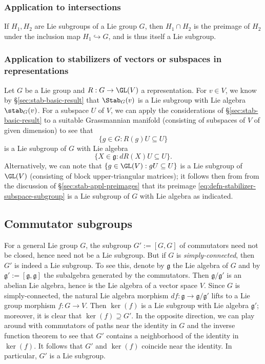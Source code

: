 \documentclass[reqno]{amsart} 
\begin{document}
\subsubsection{Application to intersections}
\label{sec:org60c2f88}
If $H_1, H_2$ are Lie subgroups of a Lie group $G$, then $H_1 \cap H_2$ is the preimage of $H_2$ under the inclusion map $H_1 \hookrightarrow G$, and is thus itself a Lie subgroup.

\subsubsection{Application to stabilizers of vectors or subspaces in representations}
\label{sec:orgc9b1def}
Let $G$ be a Lie group and $R : G \rightarrow \GL(V)$ a representation.  For $v \in V$, we know by \S\ref{sec:stab-basic-result} that $\Stab_G(v)$ is a Lie subgroup with Lie algebra $\stab_G(v)$.  For a subspace $U$ of $V$, we can apply the considerations of \S\ref{sec:stab-basic-result} to a suitable Grassmannian manifold (consisting of subspaces of $V$ of given dimension) to see that
\begin{equation}\label{eq:defn-stabilizer-subspace-subgroup}
  \{g \in G : R(g) U \subseteq U\}
\end{equation}
is a Lie subgroup of $G$ with Lie algebra
\begin{equation*}
  \{X \in \mathfrak{g} : d R(X) U \subseteq U \}.
\end{equation*}
Alternatively, we can note that $\{g \in \GL(V) : g U \subseteq U\}$ is a Lie subgroup of $\GL(V)$ (consisting of block upper-triangular matrices); it follows then from from the discussion of \S\ref{sec:stab-appl-preimages} that its preimage \eqref{eq:defn-stabilizer-subspace-subgroup} is a Lie subgroup of $G$ with Lie algebra as indicated.

\subsection{Commutator subgroups}
\label{sec:orge98ecbb}
For a general Lie group $G$, the subgroup $G' := [G,G]$ of commutators need not be closed, hence need not be a Lie subgroup.  But if $G$ is \emph{simply-connected}, then $G'$ is indeed a Lie subgroup.  To see this, denote by $\mathfrak{g}$ the Lie algebra of $G$ and by $\mathfrak{g}' := [\mathfrak{g},\mathfrak{g}]$ the subalgebra generated by the commutators.  Then $\mathfrak{g} / \mathfrak{g} '$ is an abelian Lie algebra, hence is the Lie algebra of a vector space $V$.  Since $G$ is simply-connected, the natural Lie algebra morphism $d f : \mathfrak{g} \rightarrow \mathfrak{g} / \mathfrak{g} '$ lifts to a Lie group morphism $f : G \rightarrow V$.  Then $\ker(f)$ is a Lie subgroup with Lie algebra $\mathfrak{g} '$; moreover, it is clear that $\ker(f) \supseteq G'$.  In the opposite direction, we can play around with commutators of paths near the identity in $G$ and the inverse function theorem to see that $G'$ contains a neighborhood of the identity in $\ker(f)$.  It follows that $G'$ and $\ker(f)$ coincide near the identity.  In particular, $G'$ is a Lie subgroup.
\end{document}
